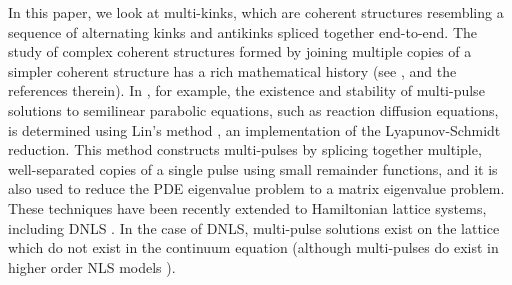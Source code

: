 \documentclass[12pt,reqno]{amsart}
\begin{document}
In this paper, we look at multi-kinks, which are coherent structures resembling a sequence of alternating kinks and antikinks spliced together end-to-end. 
The study of complex coherent structures formed by joining multiple copies of a simpler coherent structure has a rich mathematical history (see \cite{Sandstede1998}, and the references therein). In \cite{Sandstede1998}, for example, the existence and stability of multi-pulse solutions to semilinear parabolic equations, such as reaction diffusion equations, is determined using Lin's method \cites{Lin1990,Lin2008}, an implementation of the Lyapunov-Schmidt reduction. This method constructs multi-pulses by splicing together multiple, well-separated copies of a single pulse using small remainder functions, and it is also used to reduce the PDE eigenvalue problem to a matrix eigenvalue problem. These techniques have been recently extended to Hamiltonian lattice systems, including DNLS \cite{Parker2020}. In the case of DNLS, multi-pulse solutions exist on the lattice which do not exist in the continuum equation (although multi-pulses do exist in higher order NLS models \cite{Parker2021}). 
\end{document}
